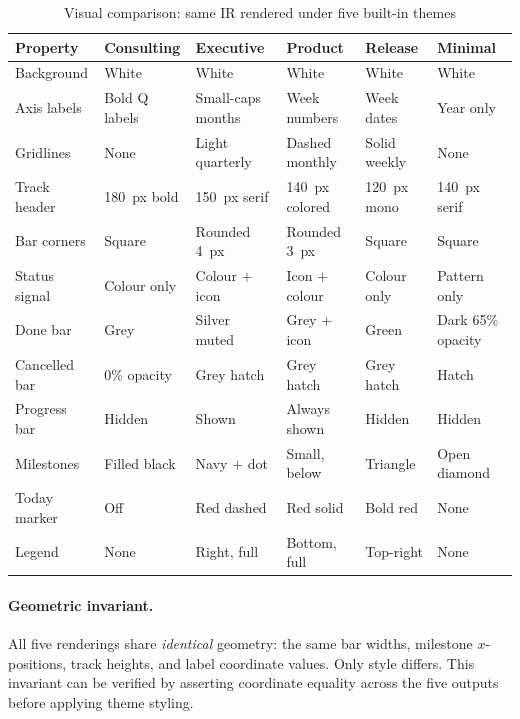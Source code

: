\begin{table}[h]
\centering
\small
\begin{tabularx}{\textwidth}{lXXXXX}
\toprule
\textbf{Property} & \textbf{Consulting} & \textbf{Executive} & \textbf{Product} & \textbf{Release} & \textbf{Minimal} \\
\midrule
Background       & White        & White            & White           & White           & White \\
Axis labels      & Bold Q labels & Small-caps months & Week numbers   & Week dates      & Year only \\
Gridlines        & None         & Light quarterly  & Dashed monthly  & Solid weekly    & None \\
Track header     & 180~px bold  & 150~px serif     & 140~px colored  & 120~px mono     & 140~px serif \\
Bar corners      & Square       & Rounded 4~px     & Rounded 3~px    & Square          & Square \\
Status signal    & Colour only  & Colour $+$ icon  & Icon $+$ colour & Colour only     & Pattern only \\
Done bar         & Grey         & Silver muted     & Grey + icon     & Green           & Dark 65\% opacity \\
Cancelled bar    & 0\% opacity  & Grey hatch       & Grey hatch      & Grey hatch      & Hatch \\
Progress bar     & Hidden       & Shown            & Always shown    & Hidden          & Hidden \\
Milestones       & Filled black & Navy $+$ dot     & Small, below    & Triangle        & Open diamond \\
Today marker     & Off          & Red dashed       & Red solid       & Bold red        & None \\
Legend           & None         & Right, full      & Bottom, full    & Top-right       & None \\
\bottomrule
\end{tabularx}
\caption{Visual comparison: same IR rendered under five built-in themes}
\label{tab:theme-comparison}
\end{table}

\paragraph{Geometric invariant.}
All five renderings share \emph{identical} geometry: the same bar widths, milestone
$x$-positions, track heights, and label coordinate values. Only style differs. This
invariant can be verified by asserting coordinate equality across the five outputs before
applying theme styling.

